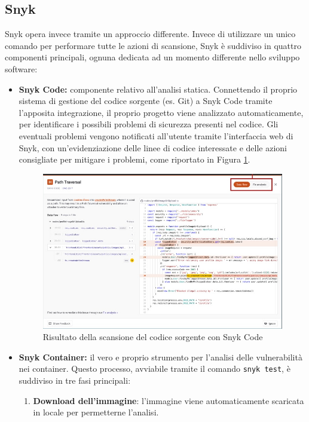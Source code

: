 \subsection{Snyk}
Snyk opera invece tramite un approccio differente\cite{snyk_docs}. Invece di utilizzare un unico comando per performare tutte le azioni di scansione, Snyk è suddiviso in quattro componenti principali, ognuna dedicata ad un momento differente nello sviluppo software:
\begin{itemize}
   \item \textbf{Snyk Code:} componente relativo all'analisi statica. Connettendo il proprio sistema di gestione del codice sorgente (es. Git) a Snyk Code tramite l'apposita integrazione, il proprio progetto viene analizzato automaticamente, per identificare i possibili problemi di sicurezza presenti nel codice. Gli eventuali problemi vengono notificati all'utente tramite l'interfaccia web di Snyk, con un'evidenziazione delle linee di codice interessate e delle azioni consigliate per mitigare i problemi, come riportato in Figura \ref{fig:snyk_code}.
         \begin{figure}[H]
            \centering
            \includegraphics[width=1\textwidth]{immagini/capitolo1/snyk_code.jpg}
            \caption{Risultato della scansione del codice sorgente con Snyk Code}
            \label{fig:snyk_code}
         \end{figure}
   \item \textbf{Snyk Container:} il vero e proprio strumento per l'analisi delle vulnerabilità nei container. Questo processo, avviabile tramite il comando \texttt{snyk test}, è suddiviso in tre fasi principali:
         \begin{enumerate}
            \item \textbf{Download dell'immagine}: l'immagine viene automaticamente scaricata in locale per permetterne l'analisi.

\end{enumerate}
\end{itemize}
